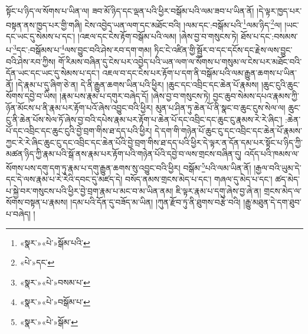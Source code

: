 སྟོང་པ་ཉིད་ལ་སོགས་པ་ཡིན་ལ། ཟབ་མོ་ཉིད་དང་ལྡན་པའི་ཕྱིར་བསྒོམ་པའི་ལམ་ཟབ་པ་ཡིན་ནོ། །དེ་ལྟར་ཁྱད་པར་བསྟན་ནས་ཁྱད་པར་གྱི་གཞི། ངེས་འབྱེད་ཡན་ལག་དང་མཐོང་བའི། །ལམ་དང་:བསྒོམ་པའི་\footnote{«སྣར་»«པེ་»སྒོམ་པའི་}ལམ་ཉིད་\footnote{«པེ་»དང་}ལ། །ཡང་དང་ཡང་དུ་སེམས་པ་དང་། །འཇལ་དང་ངེས་རྟོག་བསྒོམ་པའི་ལམ། །ཞེས་བྱ་བ་གསུངས་ཏེ། ཐོས་པ་དང་:བསམས་པ་\footnote{«སྣར་»«པེ་»བསམ་པ་}དང་:བསྒོམས་པ་\footnote{«སྣར་»«པེ་»བསྒོམ་པ་}ལས་བྱུང་བའི་ཤེས་རབ་དག་གམ། ཏིང་ངེ་འཛིན་གྱི་སྦྱོར་བ་དང་དངོས་དང་རྗེས་ལས་བྱུང་བའི་ཤེས་རབ་ཀྱིས། གོ་རིམས་བཞིན་དུ་ངེས་པར་འབྱེད་པའི་ཡན་ལག་ལ་སོགས་པ་གསུམ་ལ་ངེས་པར་མཐོང་བའི་དོན་ཡང་དང་ཡང་དུ་སེམས་པ་དང་། འཇལ་བ་དང་ངེས་པར་རྟོག་པ་དག་ནི་བསྒོམ་པའི་ལམ་རྒྱུན་ཆགས་པ་ཡིན་ནོ། །དེ་རྣམ་པ་དུ་ཞིག་ཅེ་ན། དེ་ནི་རྒྱུན་ཆགས་ཡིན་པའི་ཕྱིར། །ཆུང་དང་འབྲིང་དང་ཆེན་པོ་རྣམས། །ཆུང་ངུའི་ཆུང་སོགས་དབྱེ་བ་ཡིས། །རྣམ་པས་རྣམ་པ་དགུར་བཞེད་དོ། །ཞེས་བྱ་བ་གསུངས་ཏེ། བྱང་ཆུབ་སེམས་དཔའ་རྣམས་ཀྱི་ཉོན་མོངས་པ་ནི་རྣམ་པར་རྟོག་པའོ་ཞེས་འབྱུང་བའི་ཕྱིར། མུན་པ་ཤིན་ཏུ་ཆེན་པོ་ནི་སྣང་བ་ཆུང་ངུས་སེལ་ལ། ཆུང་ངུ་ནི་ཆེན་པོས་སེལ་ཏོ་ཞེས་བྱ་བའི་དཔེས་རྣམ་པར་རྟོག་པ་ཆེན་པོ་དང་འབྲིང་དང་ཆུང་ངུ་རྣམས་རེ་རེ་ཞིང་། :ཆེན་པོ་དང་འབྲིང་དང་ཆུང་ངུའི་བྱེ་བྲག་གིས་ཐ་དད་པའི་ཕྱིར། དེ་དག་གི་གཉེན་པོ་ཆུང་ངུ་དང་འབྲིང་དང་ཆེན་པོ་རྣམས་ཀྱང་རེ་རེ་ཞིང་ཆུང་ངུ་དང་འབྲིང་དང་ཆེན་པོའི་བྱེ་བྲག་གིས་ཐ་དད་པའི་ཕྱིར་དེ་ལྟར་ན་དོན་དམ་པར་སྟོང་པ་ཉིད་ཀྱི་མཚན་ཉིད་ཀྱི་རྣམ་པའི་སྒོ་ནས་རྣམ་པར་རྟོག་པའི་གཉེན་པོའི་དབྱེ་བ་ལས་གྲངས་བཞིན་དུ། འདོད་པའི་ཁམས་ལ་སོགས་པས་དགུ་དག་ཏུ་རྣམ་པ་དགུ་རྒྱུན་ཆགས་སུ་འབྱུང་བའི་ཕྱིར། བསྒོམ་\footnote{«སྣར་»«པེ་»སྒོམ་}པའི་ལམ་ཡིན་ནོ། །རྒྱལ་བའི་ཡུམ་དེ་དང་དེ་ལས་རྣམ་པ་རེ་རེའི་དབང་དུ་མཛད་དེ། བསོད་ནམས་གྲངས་མེད་པ་དང་། གཞལ་དུ་མེད་པ་དང་། ཚད་མེད་པ་སྐྱེ་བར་གསུངས་པའི་ཕྱིར་བྱེ་བྲག་རྣམ་པ་མང་བ་མ་ཡིན་ནམ། ཇི་ལྟར་རྣམ་པ་དགུ་ཞེས་བྱ་ཞེ་ན། གྲངས་མེད་ལ་སོགས་བསྟན་པ་རྣམས། །དམ་པའི་དོན་དུ་བཟོད་མ་ཡིན། །ཀུན་རྫོབ་ཏུ་ནི་ཐུགས་བརྩེ་བའི། །རྒྱུ་མཐུན་དེ་དག་ཐུབ་པ་བཞེད། །
